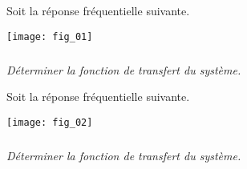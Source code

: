 \setcounter{exo}{0}

Soit la réponse fréquentielle suivante.
\begin{center}
\texttt{[image: fig\_01]}
\end{center}

\subparagraph{}
\textit{Déterminer la fonction de transfert du système.}


\vspace{.5cm}

Soit la réponse fréquentielle suivante.
\begin{center}
\texttt{[image: fig\_02]}
\end{center}

\subparagraph{}
\textit{Déterminer la fonction de transfert du système.}

